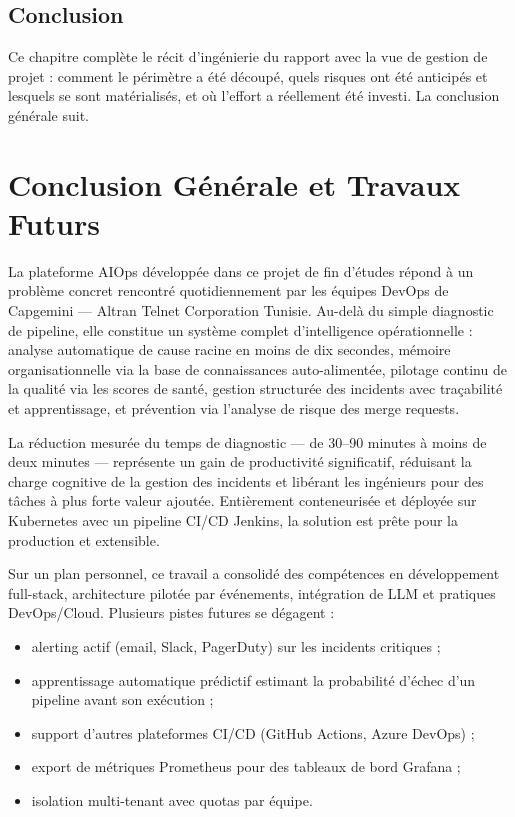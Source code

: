 \documentclass[12pt,a4paper,oneside]{report}
\begin{document}
\section{Conclusion}
Ce chapitre complète le récit d'ingénierie du rapport avec la vue de gestion de projet : comment le périmètre a été découpé, quels risques ont été anticipés et lesquels se sont matérialisés, et où l'effort a réellement été investi. La conclusion générale suit.

\chapter*{Conclusion Générale et Travaux Futurs}
La plateforme AIOps développée dans ce projet de fin d'études répond à un problème concret rencontré quotidiennement par les équipes DevOps de Capgemini --- Altran Telnet Corporation Tunisie. Au-delà du simple diagnostic de pipeline, elle constitue un système complet d'intelligence opérationnelle : analyse automatique de cause racine en moins de dix secondes, mémoire organisationnelle via la base de connaissances auto-alimentée, pilotage continu de la qualité via les scores de santé, gestion structurée des incidents avec traçabilité et apprentissage, et prévention via l'analyse de risque des merge requests.

La réduction mesurée du temps de diagnostic --- de 30--90 minutes à moins de deux minutes --- représente un gain de productivité significatif, réduisant la charge cognitive de la gestion des incidents et libérant les ingénieurs pour des tâches à plus forte valeur ajoutée. Entièrement conteneurisée et déployée sur Kubernetes avec un pipeline CI/CD Jenkins, la solution est prête pour la production et extensible.

Sur un plan personnel, ce travail a consolidé des compétences en développement full-stack, architecture pilotée par événements, intégration de LLM et pratiques DevOps/Cloud. Plusieurs pistes futures se dégagent :
\begin{itemize}
\item alerting actif (email, Slack, PagerDuty) sur les incidents critiques ;
\item apprentissage automatique prédictif estimant la probabilité d'échec d'un pipeline avant son exécution ;
\item support d'autres plateformes CI/CD (GitHub Actions, Azure DevOps) ;
\item export de métriques Prometheus pour des tableaux de bord Grafana ;
\item isolation multi-tenant avec quotas par équipe.
\end{itemize}
\end{document}
